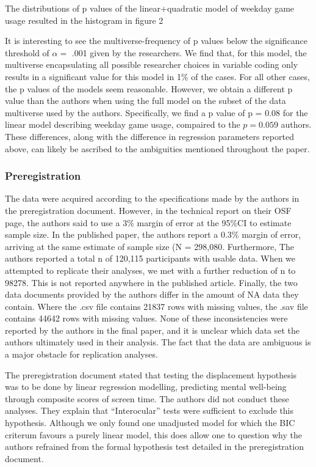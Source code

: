 \documentclass[floatsintext,man]{apa6}
\theoremstyle{definition}
\theoremstyle{definition}
\theoremstyle{definition}
\theoremstyle{remark}
\begin{document}
The distributions of p values of the linear+quadratic model of weekday
game usage resulted in the histogram in figure 2

It is interesting to see the multiverse-frequency of p values below the
significance threshold of \(\alpha =\) .001 given by the researchers. We
find that, for this model, the multiverse encapsulating all possible
researcher choices in variable coding only results in a significant
value for this model in 1\% of the cases. For all other cases, the p
values of the models seem reasonable. However, we obtain a different p
value than the authors when using the full model on the subset of the
data multiverse used by the authors. Specifically, we find a p value of
p = 0.08 for the linear model describing weekday game usage, compaired
to the \(p = 0.059\) authors. These differences, along with the
difference in regression parameters reported above, can likely be
ascribed to the ambiguities mentioned throughout the paper.

\hypertarget{preregistration}{%
\subsubsection{Preregistration}\label{preregistration}}

The data were acquired according to the specifications made by the
authors in the preregistration document. However, in the technical
report on their OSF page, the authors said to use a 3\% margin of error
at the 95\%CI to estimate sample size. In the published paper, the
authors report a 0.3\% margin of error, arriving at the same estimate of
sample size (N = 298,080. Furthermore, The authors reported a total n of
120,115 participants with usable data. When we attempted to replicate
their analyses, we met with a further reduction of n to 98278. This is
not reported anywhere in the published article. Finally, the two data
documents provided by the authors differ in the amount of NA data they
contain. Where the .csv file contains 21837 rows with missing values,
the .sav file contains 44642 rows with missing values. None of these
inconsistencies were reported by the authors in the final paper, and it
is unclear which data set the authors ultimately used in their analysis.
The fact that the data are ambiguous is a major obstacle for replication
analyses.

The preregistration document stated that testing the displacement
hypothesis was to be done by linear regression modelling, predicting
mental well-being through composite scores of screen time. The authors
did not conduct these analyses. They explain that \enquote{Interocular}
tests were sufficient to exclude this hypothesis. Although we only found
one unadjusted model for which the BIC criterum favours a purely linear
model, this does allow one to question why the authors refrained from
the formal hypothesis test detailed in the preregistration document.
\end{document}
